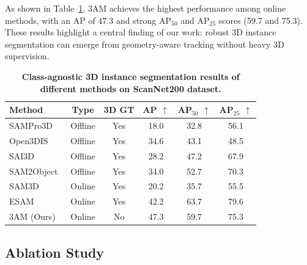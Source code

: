 As shown in Table~\ref{tab:scannet200-class-agnostic}, 3AM achieves the highest performance among online methods, with an AP of 47.3 and strong AP$_{50}$ and AP$_{25}$ scores (59.7 and 75.3).    
These results highlight a central finding of our work: robust 3D instance segmentation can emerge from geometry-aware tracking without heavy 3D supervision.



\begin{table}[t]
\centering
\small
\setlength{\tabcolsep}{2mm}
\vspace{-3mm}
\caption{\textbf{Class-agnostic 3D instance segmentation results of different methods on ScanNet200 dataset.}}
\label{tab:scannet200-class-agnostic}
\vspace{-3mm}
\begin{tabular}{lccccc}
\toprule
Method & Type & 3D GT & AP $\uparrow$ & AP$_{50}$ $\uparrow$ & AP$_{25}$ $\uparrow$ \\
\midrule
SAMPro3D~\cite{xu2025sampro3d} & Offline & Yes & 18.0 & 32.8 & 56.1 \\
Open3DIS~\cite{nguyen2024open3dis} & Offline & Yes & \cellcolor{yellow!25}34.6 & 43.1 & 48.5 \\
SAI3D~\cite{yin2024sai3d} & Offline & Yes & 28.2 & 47.2 & 67.9 \\
SAM2Object~\cite{zhao2025sam2object} & Offline & Yes & 34.0 & \cellcolor{yellow!25}52.7 & \cellcolor{yellow!25}70.3 \\
\midrule
SAM3D~\cite{yang2023sam3d} & Online & Yes & 20.2 & 35.7 & 55.5 \\
ESAM~\cite{xu2024esam} & Online & Yes & \cellcolor{orange!25}42.2 & \cellcolor{red!25}63.7 & \cellcolor{red!25}79.6 \\
\midrule
3AM (Ours) & Online & No & \cellcolor{red!25}47.3 & \cellcolor{orange!25}59.7 & \cellcolor{orange!25}75.3 \\
\bottomrule
\end{tabular}
\vspace{-3mm}
\end{table}


\vspace{-0.5em}
\subsection{Ablation Study}
\vspace{-0.5em}

